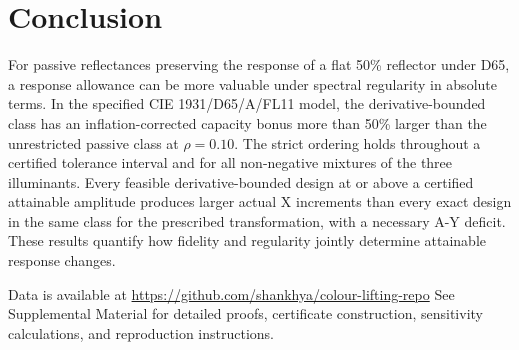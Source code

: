 \documentclass{optica-article}
\begin{document}
\section{Conclusion}
For passive reflectances preserving the response of a flat 50\% reflector under D65, a response allowance can be more valuable under spectral regularity in absolute terms. In the specified CIE 1931/D65/A/FL11 model, the derivative-bounded class has an inflation-corrected capacity bonus more than 50\% larger than the unrestricted passive class at $\rho=0.10$. The strict ordering holds throughout a certified tolerance interval and for all non-negative mixtures of the three illuminants. Every feasible derivative-bounded design at or above a certified attainable amplitude produces larger actual X increments than every exact design in the same class for the prescribed transformation, with a necessary A-Y deficit. These results quantify how fidelity and regularity jointly determine attainable response changes.

\begin{backmatter}

Data is available at \href{https://github.com/shankhya/colour-lifting-repo}{https://github.com/shankhya/colour-lifting-repo}
See Supplemental Material for detailed proofs, certificate construction, sensitivity calculations, and reproduction instructions.
\end{backmatter}

\end{document}
